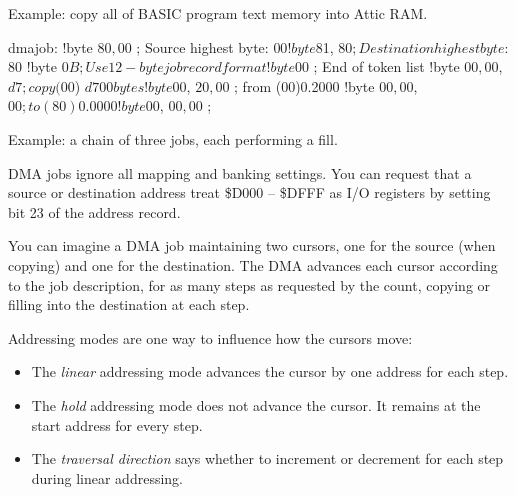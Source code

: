 Example: copy all of BASIC program text memory into Attic RAM.

\begin{asmcode}
dmajob:
!byte $80, $00       ; Source highest byte: $00
!byte $81, $80       ; Destination highest byte: $80
!byte $0B            ; Use 12-byte job record format
!byte $00            ; End of token list
!byte $00, $00, $d7  ; copy ($00) $d700 bytes
!byte $00, $20, $00  ; from (00)0.2000
!byte $00, $00, $00  ; to (80)0.0000
!byte $00, $00, $00  ;
\end{asmcode}

Example: a chain of three jobs, each performing a fill.


DMA jobs ignore all mapping and banking settings. You can request that a
source or destination address treat \$D000 -- \$DFFF as I/O registers by
setting bit 23 of the address record.

You can imagine a DMA job maintaining two cursors, one for the source (when
copying) and one for the destination. The DMA advances each cursor according to
the job description, for as many steps as requested by the count, copying or
filling into the destination at each step.

Addressing modes are one way to influence how the cursors move:

\begin{itemize}
\item The {\em linear} addressing mode advances the cursor by one address for each
step.
\item The {\em hold} addressing mode does not advance the cursor. It remains at the
start address for every step.
\item The {\em traversal direction} says whether to increment or decrement for each
step during linear addressing.
\end{itemize}


